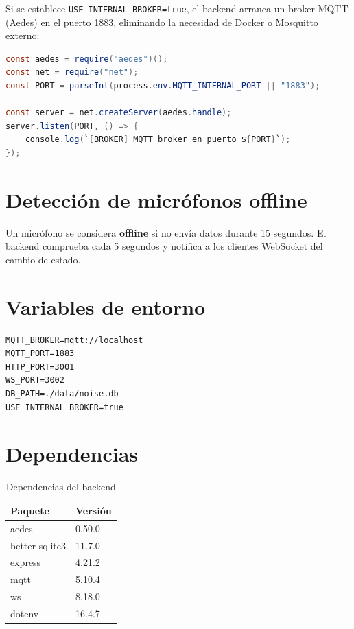 \documentclass[12pt,a4paper]{report}
\begin{document}
Si se establece \texttt{USE\_INTERNAL\_BROKER=true}, el backend arranca un broker MQTT (Aedes) en el puerto 1883, eliminando la necesidad de Docker o Mosquitto externo:

\begin{lstlisting}[language=Java, caption={Broker MQTT integrado (broker.js)}]
const aedes = require("aedes")();
const net = require("net");
const PORT = parseInt(process.env.MQTT_INTERNAL_PORT || "1883");

const server = net.createServer(aedes.handle);
server.listen(PORT, () => {
    console.log(`[BROKER] MQTT broker en puerto ${PORT}`);
});
\end{lstlisting}

\section{Detecci\'on de micr\'ofonos offline}

Un micr\'ofono se considera \textbf{offline} si no env\'ia datos durante 15 segundos. El backend comprueba cada 5 segundos y notifica a los clientes WebSocket del cambio de estado.

\section{Variables de entorno}

\begin{lstlisting}[caption={Archivo .env.example}]
MQTT_BROKER=mqtt://localhost
MQTT_PORT=1883
HTTP_PORT=3001
WS_PORT=3002
DB_PATH=./data/noise.db
USE_INTERNAL_BROKER=true
\end{lstlisting}

\section{Dependencias}

\begin{table}[H]
\centering
\begin{tabular}{ll}
\toprule
\textbf{Paquete} & \textbf{Versi\'on} \\
\midrule
aedes & 0.50.0 \\
better-sqlite3 & 11.7.0 \\
express & 4.21.2 \\
mqtt & 5.10.4 \\
ws & 8.18.0 \\
dotenv & 16.4.7 \\
\bottomrule
\end{tabular}
\caption{Dependencias del backend}
\end{table}
\end{document}
